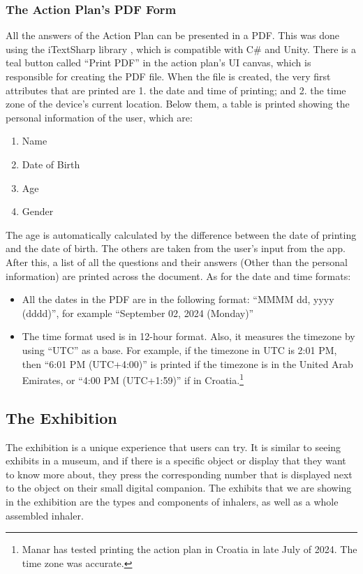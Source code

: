 \subsubsection*{The Action Plan’s PDF Form}
\label{ActionPlanPDF}
All the answers of the Action Plan can be presented in a PDF. This was done using the iTextSharp library \cite{iTextSharp}, which is compatible with C\# and Unity. There is a teal button called “Print PDF” in the action plan’s \acrshort{UI} canvas, which is responsible for creating the PDF file. When the file is created, the very first attributes that are printed are 1. the date and time of printing; and 2. the time zone of the device’s current location. Below them, a table is printed showing the personal information of the user, which are:
\begin{enumerate}
\item{Name}
\item{Date of Birth}
\item{Age}
\item{Gender}
\end{enumerate}
The age is automatically calculated by the difference between the date of printing and the date of birth. The others are taken from the user’s input from the app. After this, a list of all the questions and their answers (Other than the personal information) are printed across the document. As for the date and time formats:
\begin{itemize}
    \item{All the dates in the PDF are in the following format: “MMMM dd, yyyy (dddd)”, for example “September 02, 2024 (Monday)”}
    
    \item{The time format used is in 12-hour format. Also, it measures the timezone by using “UTC” as a base. For example, if the timezone in UTC is 2:01 PM, then “6:01 PM (UTC+4:00)” is printed if the timezone is in the United Arab Emirates, or “4:00 PM (UTC+1:59)” if in Croatia.\footnote{Manar has tested printing the action plan in Croatia in late July of 2024. The time zone was accurate.}}
\end{itemize}

\subsection{The Exhibition}

The exhibition is a unique experience that users can try. It is similar to seeing exhibits in a museum, and if there is a specific object or display that they want to know more about, they press the corresponding number that is displayed next to the object on their small digital companion. The exhibits that we are showing in the exhibition are the types and components of inhalers, as well as a whole assembled inhaler.

